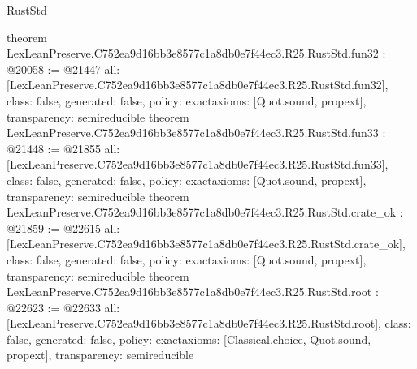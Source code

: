 \begin{lexlean}{RustStd}
\begin{coremodule}
{}
theorem LexLeanPreserve.C752ea9d16bb3e8577c1a8db0e7f44ec3.R25.RustStd.fun32 : @20058 := @21447 {
  all: [LexLeanPreserve.C752ea9d16bb3e8577c1a8db0e7f44ec3.R25.RustStd.fun32],
  class: false,
  generated: false,
  policy: exact{axioms: [Quot.sound, propext]},
  transparency: semireducible
}
theorem LexLeanPreserve.C752ea9d16bb3e8577c1a8db0e7f44ec3.R25.RustStd.fun33 : @21448 := @21855 {
  all: [LexLeanPreserve.C752ea9d16bb3e8577c1a8db0e7f44ec3.R25.RustStd.fun33],
  class: false,
  generated: false,
  policy: exact{axioms: [Quot.sound, propext]},
  transparency: semireducible
}
theorem LexLeanPreserve.C752ea9d16bb3e8577c1a8db0e7f44ec3.R25.RustStd.crate_ok : @21859 := @22615 {
  all: [LexLeanPreserve.C752ea9d16bb3e8577c1a8db0e7f44ec3.R25.RustStd.crate_ok],
  class: false,
  generated: false,
  policy: exact{axioms: [Quot.sound, propext]},
  transparency: semireducible
}
theorem LexLeanPreserve.C752ea9d16bb3e8577c1a8db0e7f44ec3.R25.RustStd.root : @22623 := @22633 {
  all: [LexLeanPreserve.C752ea9d16bb3e8577c1a8db0e7f44ec3.R25.RustStd.root],
  class: false,
  generated: false,
  policy: exact{axioms: [Classical.choice, Quot.sound, propext]},
  transparency: semireducible
}


\end{coremodule}
\end{lexlean}

